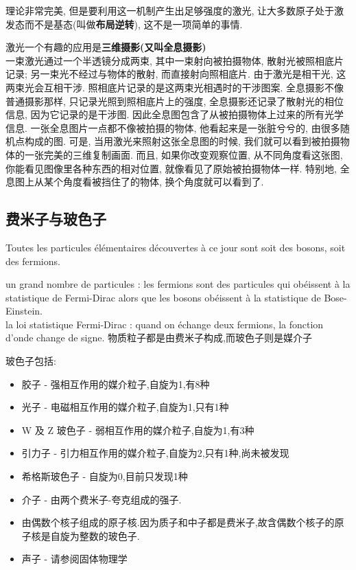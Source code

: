 \documentclass[openany]{book}
\begin{document}
理论非常完美, 但是要利用这一机制产生出足够强度的激光, 让大多数原子处于激发态而不是基态(叫做\textbf{布局逆转}), 这不是一项简单的事情.

激光一个有趣的应用是\textbf{三维摄影(又叫全息摄影)}\\
一束激光通过一个半透镜分成两束, 其中一束射向被拍摄物体, 散射光被照相底片记录; 另一束光不经过与物体的散射, 而直接射向照相底片. 由于激光是相干光, 这两束光会互相干涉.
照相底片记录的是这两束光相遇时的干涉图案. 全息摄影不像普通摄影那样, 只记录光照到照相底片上的强度, 全息摄影还记录了散射光的相位信息, 因为它记录的是干涉图. 
因此全息图包含了从被拍摄物体上过来的所有光学信息. 一张全息图片一点都不像被拍摄的物体, 他看起来是一张脏兮兮的, 由很多随机点构成的图. 
可是, 当用激光来照射这张全息图的时候, 我们就可以看到被拍摄物体的一张完美的三维复制画面. 
而且, 如果你改变观察位置, 从不同角度看这张图, 你能看见图像里各种东西的相对位置, 就像看见了原始被拍摄物体一样. 
特别地, 全息图上从某个角度看被挡住了的物体, 换个角度就可以看到了.

\subsection{费米子与玻色子}
Toutes les particules \'el\'ementaires d\'ecouvertes \`a ce jour sont soit des bosons, soit des fermions.\par

un grand nombre de particules : les fermions sont des particules qui ob\'eissent \`a la statistique de Fermi-Dirac alors que les bosons ob\'eissent \`a la statistique de Bose-Einstein.\\
la loi statistique Fermi-Dirac : quand on \'echange deux fermions, la fonction d'onde change de signe.
物质粒子都是由费米子构成,而玻色子则是媒介子

玻色子包括:
\begin{itemize}
\item 胶子 - 强相互作用的媒介粒子,自旋为1,有8种
\item 光子 - 电磁相互作用的媒介粒子,自旋为1,只有1种
\item W 及 Z 玻色子 - 弱相互作用的媒介粒子,自旋为1,有3种
\item 引力子 - 引力相互作用的媒介粒子,自旋为2,只有1种,尚未被发现
\item 希格斯玻色子 - 自旋为0,目前只发现1种
\item 介子 - 由两个费米子-夸克组成的强子.
\item 由偶数个核子组成的原子核.因为质子和中子都是费米子,故含偶数个核子的原子核是自旋为整数的玻色子.
\item 声子 - 请参阅固体物理学
\end{itemize}
\end{document}
